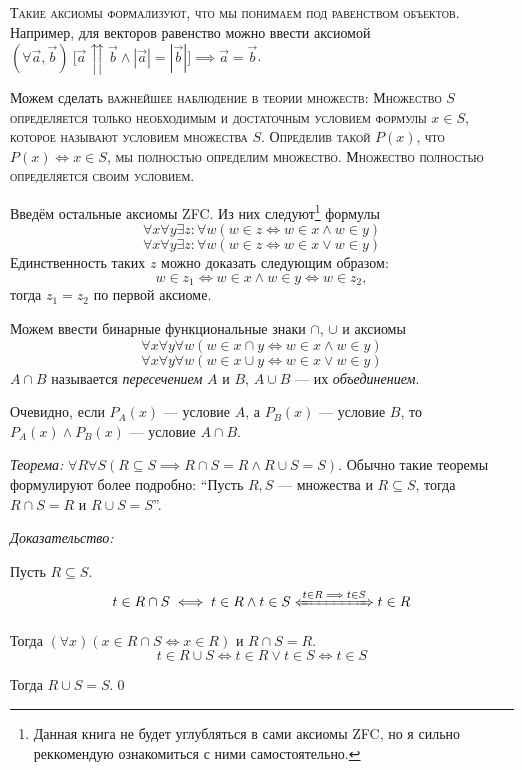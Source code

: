 \textsc{Такие аксиомы формализуют, что мы понимаем под равенством объектов.}
Например, для векторов равенство можно ввести аксиомой
$(\forall \vec{a},\vec{b})~
	\big[\vec{a}\upuparrows\vec{b}\land|\vec{a}|=|\vec{b}|\big]
	\implies \vec{a}=\vec{b}$.

Можем сделать \textsc{важнейшее наблюдение в теории множеств: Множество $S$
	определяется только необходимым и достаточным условием формулы $x\in S$,
	которое называют условием множества $S$.
	Определив такой $P(x)$, что $P(x)\iff x\in S$, мы полностью определим множество.
	Множество полностью определяется своим условием.}

Введём остальные аксиомы ZFC. Из них следуют\footnote{
	Данная книга не будет углубляться в сами аксиомы ZFC, но я сильно реккомендую
	ознакомиться с ними самостоятельно.}
формулы
\[
	\forall x\forall y\exists z:\forall w(w\in z\iff w\in x\land w\in y)
\]
\[
	\forall x\forall y\exists z:\forall w(w\in z\iff w\in x\lor w\in y)
\]
Единственность таких $z$ можно доказать следующим образом:
\[
	w\in z_1\iff w\in x\land w\in y\iff w\in z_2,
\]
тогда $z_1=z_2$ по первой аксиоме.

Можем ввести бинарные функциональные знаки $\cap$, $\cup$ и аксиомы
\[
	\forall x\forall y\forall w(w\in x\cap y\iff w\in x\land w\in y)
\]
\[
	\forall x\forall y\forall w(w\in x\cup y\iff w\in x\lor w\in y)
\]
$A\cap B$ называется {\it пересечением} $A$ и $B$,
$A\cup B$ --- их {\it объединением}.

Очевидно, если $P_{A}(x)$ --- условие $A$, а $P_{B}(x)$ --- условие $B$,
то $P_{A}(x)\land P_{B}(x)$ --- условие $A\cap B$.

\vspace{1em}
{\it Теорема:} ${\forall R\forall S(R\subseteq S\implies R\cap S=R\land R\cup S=S)}$.
Обычно такие теоремы формулируют более подробно:
``Пусть $R,S$ --- множества и $R\subseteq S$, тогда $R\cap S=R$ и $R\cup S=S$''.

{\it Доказательство:}

Пусть $R\subseteq S$.
\[
	t\in R\cap S\iff t\in R\land t\in S\xLeftrightarrow{t\in R\implies t\in S} t\in R
\]

Тогда $(\forall x)(x\in R\cap S\iff x\in R)$ и $R\cap S=R$.
\[
	t\in R\cup S\iff t\in R\lor t\in S\iff t\in S
\]

Тогда $R\cup S=S$.\qed

